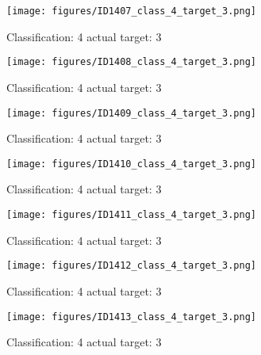 \begin{figure}[h!]
\begin{center}
\texttt{[image: figures/ID1407\_class\_4\_target\_3.png]}
\end{center}
\caption{ Classification: 4 actual target: 3}
\label{fig:ID1407_class_4_target_3}
\end{figure}
\begin{figure}[h!]
\begin{center}
\texttt{[image: figures/ID1408\_class\_4\_target\_3.png]}
\end{center}
\caption{ Classification: 4 actual target: 3}
\label{fig:ID1408_class_4_target_3}
\end{figure}
\begin{figure}[h!]
\begin{center}
\texttt{[image: figures/ID1409\_class\_4\_target\_3.png]}
\end{center}
\caption{ Classification: 4 actual target: 3}
\label{fig:ID1409_class_4_target_3}
\end{figure}
\begin{figure}[h!]
\begin{center}
\texttt{[image: figures/ID1410\_class\_4\_target\_3.png]}
\end{center}
\caption{ Classification: 4 actual target: 3}
\label{fig:ID1410_class_4_target_3}
\end{figure}
\begin{figure}[h!]
\begin{center}
\texttt{[image: figures/ID1411\_class\_4\_target\_3.png]}
\end{center}
\caption{ Classification: 4 actual target: 3}
\label{fig:ID1411_class_4_target_3}
\end{figure}
\begin{figure}[h!]
\begin{center}
\texttt{[image: figures/ID1412\_class\_4\_target\_3.png]}
\end{center}
\caption{ Classification: 4 actual target: 3}
\label{fig:ID1412_class_4_target_3}
\end{figure}
\begin{figure}[h!]
\begin{center}
\texttt{[image: figures/ID1413\_class\_4\_target\_3.png]}
\end{center}
\caption{ Classification: 4 actual target: 3}
\label{fig:ID1413_class_4_target_3}
\end{figure}
